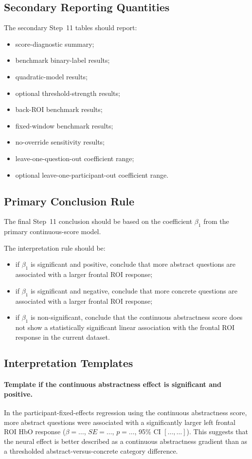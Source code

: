 \subsection{Secondary Reporting Quantities}
The secondary Step~11 tables should report:
\begin{itemize}
    \item score-diagnostic summary;
    \item benchmark binary-label results;
    \item quadratic-model results;
    \item optional threshold-strength results;
    \item back-ROI benchmark results;
    \item fixed-window benchmark results;
    \item no-override sensitivity results;
    \item leave-one-question-out coefficient range;
    \item optional leave-one-participant-out coefficient range.
\end{itemize}

\subsection{Primary Conclusion Rule}
The final Step~11 conclusion should be based on the coefficient \(\beta_1\) from the
primary continuous-score model.

The interpretation rule should be:
\begin{itemize}
    \item if \(\beta_1\) is significant and positive, conclude that more abstract questions are associated
    with a larger frontal ROI response;
    \item if \(\beta_1\) is significant and negative, conclude that more concrete questions are associated
    with a larger frontal ROI response;
    \item if \(\beta_1\) is non-significant, conclude that the continuous abstractness score does not
    show a statistically significant linear association with the frontal ROI response in the current dataset.
\end{itemize}

\subsection{Interpretation Templates}

\paragraph{Template if the continuous abstractness effect is significant and positive.}
In the participant-fixed-effects regression using the continuous abstractness score, more abstract
questions were associated with a significantly larger left frontal ROI HbO response
(\(\beta=\ldots\), \(SE=\ldots\), \(p=\ldots\), 95\% CI \([\ldots,\ldots]\)).
This suggests that the neural effect is better described as a continuous abstractness gradient
than as a thresholded abstract-versus-concrete category difference.

